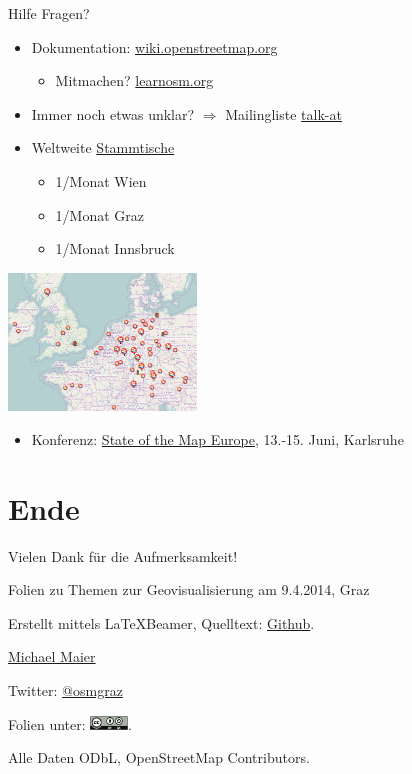 \documentclass{beamer}
\begin{document}
\begin{frame}{Hilfe}
Fragen? 
\begin{itemize}
  \item Dokumentation: \href{http://wiki.openstreetmap.org}{wiki.openstreetmap.org}
  \begin{itemize} 
    \item Mitmachen? \href{http://learnosm.org/}{learnosm.org}
  \end{itemize}
  \item Immer noch etwas unklar? $\Rightarrow$ Mailingliste \href{http://lists.openstreetmap.org/listinfo/talk-at}{talk-at}
  \item Weltweite \href{http://usergroups.openstreetmap.de/}{Stammtische}
  \begin{itemize}
    \item 1/Monat Wien
    \item 1/Monat Graz
    \item 1/Monat Innsbruck
  \end{itemize}

\end{itemize}

 \vspace*{-2.0cm}
\hfill\includegraphics[width=5cm]{stammtische.png}

\begin{itemize}
  \item Konferenz: \href{http://sotm-eu.org/}{State of the Map Europe}, 13.-15. Juni, Karlsruhe
\end{itemize}
\end{frame}

\section{Ende}

\begin{frame}{Vielen Dank für die Aufmerksamkeit!}

  Folien zu Themen zur Geovisualisierung am 9.4.2014, Graz
\vspace{1cm}

Erstellt mittels \LaTeX Beamer, Quelltext: \href{https://github.com/species/vortrag-osm-kfu-geovis}{Github}.
\vspace{1cm}

\href{mailto:michael.maier@student.tugraz.at}{Michael Maier}

Twitter: \href{https://twitter.com/osmgraz}{@osmgraz}
\vspace{1cm}

Folien unter: \includegraphics[width=1cm]{cc-by-sa.pdf}. 

Alle Daten ODbL, OpenStreetMap Contributors.

\end{frame}
\end{document}
